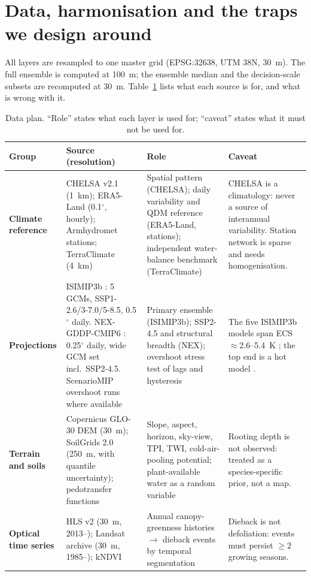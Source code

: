 \section{Data, harmonisation and the traps we design around}\label{sec:data}

All layers are resampled to one master grid (EPSG:32638, UTM 38N, 30~m). The full ensemble is computed at 100~m; the ensemble median and the decision-scale subsets are recomputed at 30~m. Table~\ref{tab:data} lists what each source is for, and what is wrong with it.

\begin{table}[t]
\centering
\caption{Data plan. ``Role'' states what each layer is used for; ``caveat'' states what it must not be used for.}\label{tab:data}
\footnotesize
\begin{tabularx}{\linewidth}{@{}>{\raggedright\arraybackslash\bfseries\sffamily}p{2.15cm}>{\raggedright\arraybackslash}p{4.9cm}>{\raggedright\arraybackslash}X>{\raggedright\arraybackslash}p{4.0cm}@{}}
\toprule
Group & Source (resolution) & Role & Caveat\\
\midrule
Climate reference & CHELSA v2.1 \citep{Karger2017} (1~km); ERA5-Land \citep{MunozSabater2021} (0.1$^\circ$, hourly); Armhydromet stations; TerraClimate \citep{Abatzoglou2018} (4~km) & Spatial pattern (CHELSA); daily variability and QDM reference (ERA5-Land, stations); independent water-balance benchmark (TerraClimate) & CHELSA is a climatology: never a source of interannual variability. Station network is sparse and needs homogenisation.\\
Projections & ISIMIP3b \citep{Lange2019,Lange2021}: 5 GCMs, SSP1-2.6/3-7.0/5-8.5, 0.5$^\circ$ daily. NEX-GDDP-CMIP6 \citep{Thrasher2022}: 0.25$^\circ$ daily, wide GCM set incl.\ SSP2-4.5. ScenarioMIP overshoot runs where available & Primary ensemble (ISIMIP3b); SSP2-4.5 and structural breadth (NEX); overshoot stress test of lags and hysteresis & The five ISIMIP3b models span ECS $\approx$2.6--5.4~K \citep{Zelinka2020}; the top end is a hot model \citep{Hausfather2022}.\\
Terrain and soils & Copernicus GLO-30 DEM (30~m); SoilGrids 2.0 \citep{Poggio2021} (250~m, with quantile uncertainty); pedotransfer functions \citep{Saxton2006} & Slope, aspect, horizon, sky-view, TPI, TWI, cold-air-pooling potential; plant-available water as a random variable & Rooting depth is not observed: treated as a species-specific prior, not a map.\\
Optical time series & HLS v2 \citep{Claverie2018} (30~m, 2013--); Landsat archive (30~m, 1985--); kNDVI \citep{CampsValls2021} & Annual canopy-greenness histories $\rightarrow$ dieback events by temporal segmentation \citep{Kennedy2010,Zhu2014} & Dieback is not defoliation: events must persist $\ge2$ growing seasons.\\

\end{tabularx}
\end{table}
